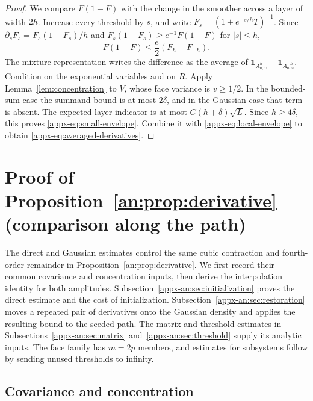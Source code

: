 \documentclass[11pt,letterpaper]{article}
\newenvironment{recovered}{}{}
\theoremstyle{remark}
\newcommand{\ind}{\mathbf 1}
\begin{document}
\begin{proof}
We compare \(F(1-F)\) with the change in the smoother across a layer
of width \(2h\). Increase every threshold by \(s\), and write
\(F_s=(1+e^{-s/h}T)^{-1}\). Since
\(\partial_sF_s=F_s(1-F_s)/h\) and
\(F_s(1-F_s)\ge e^{-1}F(1-F)\) for \(|s|\le h\),
\begin{recovered}
\begin{equation}\label{appx-eq:F(1-F)}
 F(1-F)\le\frac e2(F_h-F_{-h}).
\end{equation}
\end{recovered}
The mixture representation writes the difference as the average of
\(\ind_{A_{a,\omega}^h}-\ind_{A_{a,\omega}^{-h}}\).
Condition on the {exponential variables} and on \(R\). Apply
Lemma~\ref{lem:concentration} to \(V\), whose face variance is
\(v\ge1/2\). In the bounded-sum case the summand bound is at most
\(2\delta\), and in the Gaussian case that term is absent. The expected
layer indicator is at most \(C(h+\delta)\sqrt L\). Since \(h\ge4\delta\), this proves
\eqref{appx-eq:small-envelope}. Combine it with
\eqref{appx-eq:local-envelope} to obtain
\eqref{appx-eq:averaged-derivatives}.
\end{proof}

\section{Proof of Proposition~\ref*{an:prop:derivative} (comparison along the path)}
\label{appx-sec:support}

The direct and Gaussian estimates control the same cubic contraction
and fourth-order remainder in Proposition~\ref{an:prop:derivative}.
We first record their common covariance and concentration inputs,
then derive the interpolation identity for both amplitudes.
Subsection~\ref{appx-an:sec:initialization} proves the
direct estimate and the cost of initialization. Subsection~\ref{appx-an:sec:restoration}
moves a repeated pair of derivatives onto the Gaussian density and
applies the resulting bound to the seeded path.
The matrix and threshold estimates in Subsections~\ref{appx-an:sec:matrix}
and~\ref{appx-an:sec:threshold} supply its analytic inputs. The face
family has \(m=2p\) members, and estimates for subsystems follow by
sending unused thresholds to infinity.

\subsection{Covariance and concentration}
\label{appx-an:sec:coords}
\end{document}
